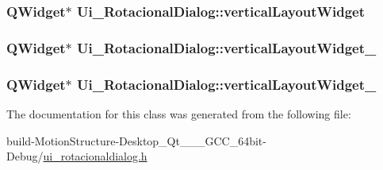 \hypertarget{class_ui___rotacional_dialog_a060719d4871c77aaecc6d0f2def863f4}{
\subsubsection[{vertical\-Layout\-Widget}]{\setlength{\rightskip}{0pt plus 5cm}Q\-Widget$\ast$ Ui\-\_\-\-Rotacional\-Dialog\-::vertical\-Layout\-Widget}}\label{class_ui___rotacional_dialog_a060719d4871c77aaecc6d0f2def863f4}
\hypertarget{class_ui___rotacional_dialog_ade317e77d8449231a328936d44adaefb}{
\subsubsection[{vertical\-Layout\-Widget\-\_\-3}]{\setlength{\rightskip}{0pt plus 5cm}Q\-Widget$\ast$ Ui\-\_\-\-Rotacional\-Dialog\-::vertical\-Layout\-Widget\-\_}}\label{class_ui___rotacional_dialog_ade317e77d8449231a328936d44adaefb}
\hypertarget{class_ui___rotacional_dialog_af008c7b04e3b628a96164618c695d0b2}{
\subsubsection[{vertical\-Layout\-Widget\-\_\-5}]{\setlength{\rightskip}{0pt plus 5cm}Q\-Widget$\ast$ Ui\-\_\-\-Rotacional\-Dialog\-::vertical\-Layout\-Widget\-\_}}\label{class_ui___rotacional_dialog_af008c7b04e3b628a96164618c695d0b2}


The documentation for this class was generated from the following file\-:\begin{DoxyCompactItemize}
\item 
build-\/\-Motion\-Structure-\/\-Desktop\-\_\-\-Qt\-\_\-\_\-\_\-\-G\-C\-C\-\_\-64bit-\/\-Debug/\hyperlink{ui__rotacionaldialog_8h}{ui\-\_\-rotacionaldialog.\-h}\end{DoxyCompactItemize}
